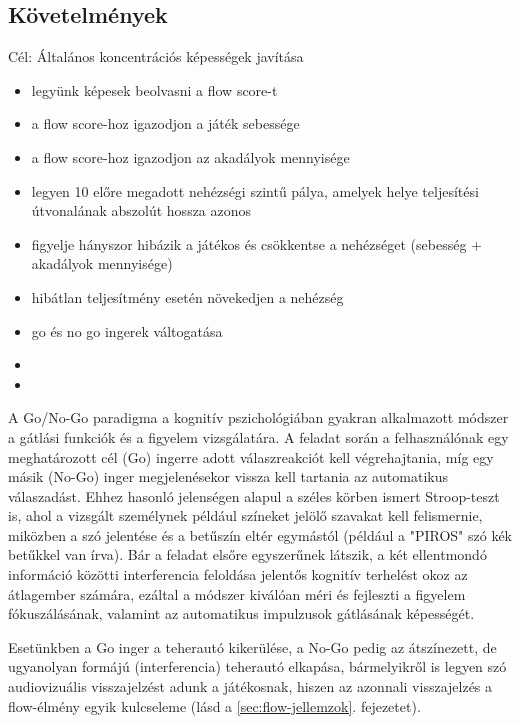 \subsection{Követelmények}

Cél: Általános koncentrációs képességek javítása

\begin{itemize}
    \item legyünk képesek beolvasni a flow score-t
    \item a flow score-hoz igazodjon a játék sebessége
    \item a flow score-hoz igazodjon az akadályok mennyisége
    \item legyen 10 előre megadott nehézségi szintű pálya, amelyek helye teljesítési útvonalának abszolút hossza azonos
    \item figyelje hányszor hibázik a játékos és csökkentse a nehézséget (sebesség + akadályok mennyisége)
    \item hibátlan teljesítmény esetén növekedjen a nehézség
    \item go és no go ingerek váltogatása
    \item 
    \item 
\end{itemize}

A Go/No-Go paradigma a kognitív pszichológiában gyakran alkalmazott módszer a gátlási funkciók és a figyelem vizsgálatára. A feladat során a felhasználónak egy meghatározott cél (Go) ingerre adott válaszreakciót kell végrehajtania, míg egy másik (No-Go) inger megjelenésekor vissza kell tartania az automatikus válaszadást. Ehhez hasonló jelenségen alapul a széles körben ismert Stroop-teszt is, ahol a vizsgált személynek például színeket jelölő szavakat kell felismernie, miközben a szó jelentése és a betűszín eltér egymástól (például a "PIROS" szó kék betűkkel van írva). Bár a feladat elsőre egyszerűnek látszik, a két ellentmondó információ közötti interferencia feloldása jelentős kognitív terhelést okoz az átlagember számára, ezáltal a módszer kiválóan méri és fejleszti a figyelem fókuszálásának, valamint az automatikus impulzusok gátlásának képességét.

Esetünkben a Go inger a teherautó kikerülése, a No-Go pedig az átszínezett, de ugyanolyan formájú (interferencia) teherautó elkapása, bármelyikről is legyen szó audiovizuális visszajelzést adunk a játékosnak, hiszen az azonnali visszajelzés a flow-élmény egyik kulcseleme (lásd a \ref{sec:flow-jellemzok}. fejezetet).

